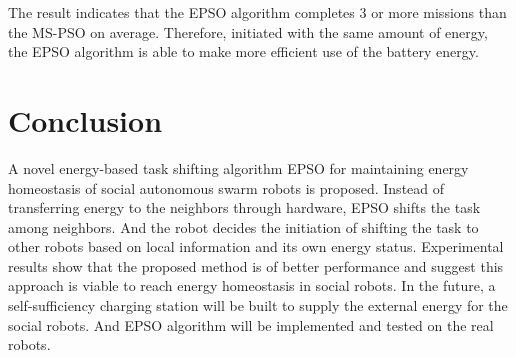 \documentclass[journal]{IEEEtran}
\begin{document}
The result indicates that the EPSO algorithm completes 3 or more missions than the MS-PSO on average. Therefore, initiated with the same amount of energy, the EPSO algorithm is able to make more efficient use of the battery energy.

\section{Conclusion}
\label{sec:5}
A novel energy-based task shifting algorithm EPSO for maintaining energy homeostasis of social autonomous swarm robots is proposed. Instead of transferring energy to the neighbors through hardware, EPSO shifts the task among neighbors. And the robot decides the initiation of shifting the task to other robots based on local information and its own energy status. Experimental results show that the proposed method is of better performance and suggest this approach is viable to reach energy homeostasis in social robots.
In the future, a self-sufficiency charging station will be built to supply the external energy for the social robots. And EPSO algorithm will be implemented and tested on the real robots.


%

\appendices
\end{document}
